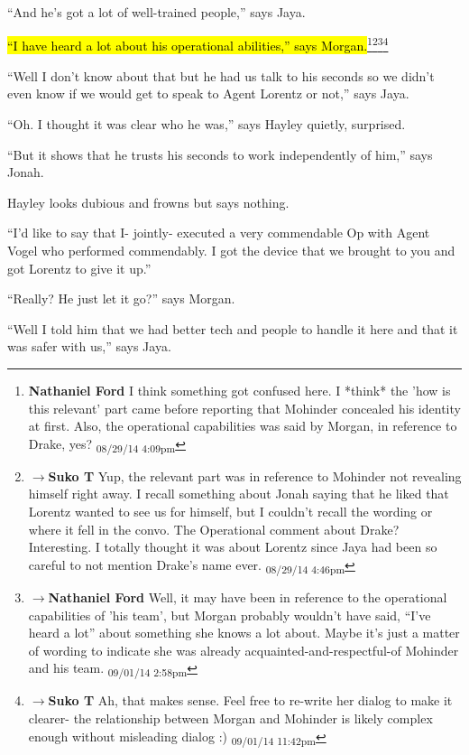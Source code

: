 ``And he's got a lot of well-trained people,'' says Jaya.

\hl{``I have heard a lot about his operational abilities,'' says Morgan.}\footnote{\textbf{Nathaniel Ford }I think something got confused here. I *think* the 'how is this relevant' part came before reporting that Mohinder concealed his identity at first. Also, the operational capabilities was said by Morgan, in reference to Drake, yes? \textsubscript{08/29/14 4:09pm}}\footnote{$\rightarrow$\textbf{Suko T }Yup, the relevant part was in reference to Mohinder not revealing himself right away.  I recall something about Jonah saying that he liked that Lorentz wanted to see us for himself, but I couldn't recall the wording or where it fell in the convo.  The Operational comment about Drake?   Interesting.  I totally thought it was about Lorentz since Jaya had been so careful to not mention Drake's name ever. \textsubscript{08/29/14 4:46pm}}\footnote{$\rightarrow$\textbf{Nathaniel Ford }Well, it may have been in reference to the operational capabilities of 'his team', but Morgan probably wouldn't have said, ``I've heard a lot'' about something she knows a lot about. Maybe it's just a matter of wording to indicate she was already acquainted-and-respectful-of Mohinder and his team. \textsubscript{09/01/14 2:58pm}}\footnote{$\rightarrow$\textbf{Suko T }Ah, that makes sense.  Feel free to re-write her dialog to make it clearer- the relationship between Morgan and Mohinder is likely complex enough without misleading dialog :) \textsubscript{09/01/14 11:42pm}}

``Well I don't know about that but he had us talk to his seconds so we didn't even know if we would get to speak to Agent Lorentz or not,'' says Jaya.

``Oh.  I thought it was clear who he was,'' says Hayley quietly, surprised.

``But it shows that he trusts his seconds to work independently of him,'' says Jonah.

Hayley looks dubious and frowns but says nothing.

``I'd like to say that I- jointly- executed a very commendable Op with Agent Vogel who performed commendably.  I got the device that we brought to you and got Lorentz to give it up.''

``Really?  He just let it go?'' says Morgan.

``Well I told him that we had better tech and people to handle it here and that it was safer with us,'' says Jaya.

